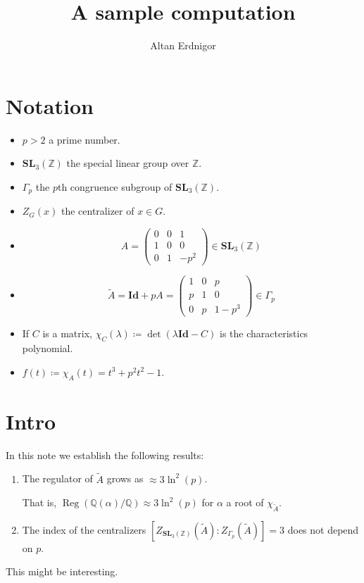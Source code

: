 \documentclass[a4paper]{article}
\DeclareMathOperator{\assign}{\coloneqq}        %
\newcommand{\Q}{\mathbb{Q}}        %
\newcommand{\Id}{\mathbf{Id}}        %
\newcommand{\SL}{\mathbf{SL}_3(\mathbb{Z})}        %
\newcommand{\SLp}{\Gamma_p}        %
\DeclareMathOperator{\Reg}{Reg}        %
\begin{document}
\title{A sample computation}	
\author{Altan Erdnigor}
\maketitle

\tableofcontents

\section{Notation}
\begin{itemize}
\item $p > 2$ a prime number.
\item $\SL$ the special linear group over $\mathbb{Z}$.
\item $\SLp$ the $p$th congruence subgroup of $\SL$.
\item $Z_G(x)$ the centralizer of $x \in G$.
\item 
\begin{equation}
\label{matrix_small}
A = 
\begin{pmatrix}
0 & 0 & 1 \\
1 & 0 & 0 \\
0 & 1 & -p^2
\end{pmatrix}
\in \SL
\end{equation}
\item 
\begin{equation}
\label{matrix_big}
\tilde A = \Id + p A =
\begin{pmatrix}
1 & 0 & p \\
p & 1 & 0 \\
0 & p & 1 - p^3
\end{pmatrix}
\in \SLp
\end{equation}

\item If $C$ is a matrix, $\chi_C(\lambda) \assign \det(\lambda \Id - C)$ is the characteristics polynomial.
\item $ f(t) \assign \chi_A(t) = t^3 + p^2 t^2 - 1$.

\end{itemize}

\section{Intro}
In this note we establish the following results:
\begin{enumerate}
\item
The regulator of $\tilde A$
grows as $\approx 3 \ln^2(p)$. 

That is, $\Reg ( \Q(\alpha)/\Q ) \approx 3 \ln^2(p) $ for $\alpha$ a root of $\chi_{\tilde A}$.

\item
The index of the centralizers
$ [Z_{\SL}(\tilde A) : Z_{\SLp}(\tilde A)] = 3$
does not depend on $p$.
\end{enumerate}
This might be interesting.
\end{document}
